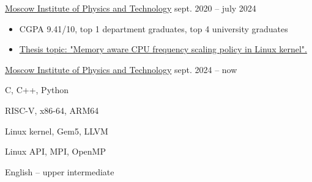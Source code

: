         {\href{https://mipt.ru}{Moscow Institute of Physics and Technology}}
        {sept. 2020 -- july 2024}{}

    \begin{itemize}
        \item CGPA 9.41/10, top 1 department graduates, top 4 university graduates
        \item \href{https://github.com/Vokerlee/macfm-governor-thesis}
                   {Thesis topic: "Memory aware CPU frequency scaling policy in Linux kernel".}
    \end{itemize}

        {\href{https://mipt.ru}{Moscow Institute of Physics and Technology}}
        {sept. 2024 -- now}{}


    C, C++, Python
    \smallskip

    RISC-V, x86-64, ARM64
    \smallskip

    Linux kernel, Gem5, LLVM
    \smallskip

    Linux API, MPI, OpenMP
    \smallskip

    English -- upper intermediate


    \vspace{-1mm}
